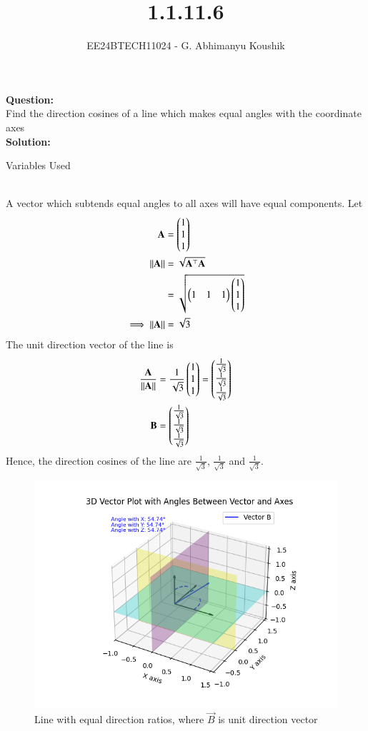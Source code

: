 \documentclass[journal]{IEEEtran}
\begin{document}

\vspace{3cm}

\title{1.1.11.6}
\author{EE24BTECH11024 - G. Abhimanyu Koushik
}
{\let\newpage\relax\maketitle}

\renewcommand{\thefigure}{\theenumi}
\renewcommand{\thetable}{\theenumi}
\setlength{\intextsep}{10pt} %

\textbf{Question:}\\
Find the direction cosines of a line which makes equal angles with the coordinate axes
\\
\textbf{Solution:}
\begin{table}[h!]    
  \centering
  
  \caption{Variables Used}
  \label{tab10.5.3.9.1}
\end{table}\\
A vector which subtends equal angles to all axes will have equal components. Let 
\begin{align}
	\mathbf{A} &= \begin{pmatrix}1\\1\\1\end{pmatrix}\\
	\left\lVert\mathbf{A}\right\rVert &= \sqrt{\mathbf{A}^\top\mathbf{A}}\\
		     &= \sqrt{\begin{pmatrix}1 & 1 & 1\end{pmatrix}\begin{pmatrix}1\\1\\1\end{pmatrix}}\\
	\implies \left\lVert\mathbf{A}\right\rVert &= \sqrt{3}
\end{align}
The unit direction vector of the line is
\begin{align}
	\frac{\mathbf{A}}{\left\lVert\mathbf{A}\right\rVert} &= \frac{1}{\sqrt{3}}\begin{pmatrix}1\\1\\1\end{pmatrix} = \begin{pmatrix}\frac{1}{\sqrt{3}}\\\frac{1}{\sqrt{3}}\\\frac{1}{\sqrt{3}}\end{pmatrix}\\
	\mathbf{B} &= \begin{pmatrix}\frac{1}{\sqrt{3}}\\\frac{1}{\sqrt{3}}\\\frac{1}{\sqrt{3}}\end{pmatrix}
\end{align}
Hence, the direction cosines of the line are $\frac{1}{\sqrt{3}}$, $\frac{1}{\sqrt{3}}$ and $\frac{1}{\sqrt{3}}$.

\begin{figure}[h!]
   \centering
   \includegraphics[width=0.7\linewidth]{figs/fig.png}
   \caption{Line with equal direction ratios, where $\vec{B}$ is unit direction vector}
\end{figure}
\end{document}
